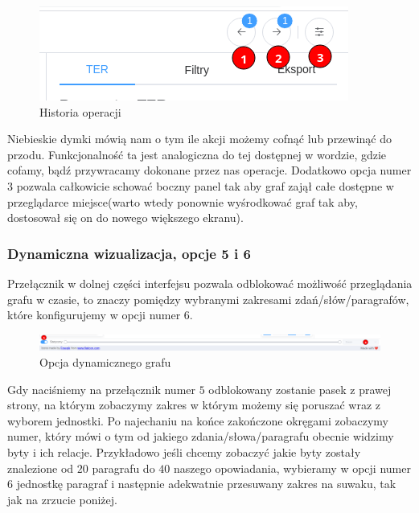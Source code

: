 \documentclass[12pt, a4paper]{article}
\begin{document}
\begin{figure}[H]
    \centering
    \includegraphics[width=\linewidth]{images/graph-top-navigation.png}
    \caption{Historia operacji}
\end{figure}

\noindent Niebieskie dymki mówią nam o tym ile akcji możemy cofnąć lub przewinąć do przodu. Funkcjonalność ta jest analogiczna do tej dostępnej w wordzie, gdzie cofamy, bądź przywracamy dokonane przez nas operacje. Dodatkowo opcja numer $3$ pozwala całkowicie schować boczny panel tak aby graf zajął całe dostępne w przeglądarce miejsce(warto wtedy ponownie wyśrodkować graf tak aby, dostosował się on do nowego większego ekranu).

\subsubsection{Dynamiczna wizualizacja, opcje 5 i 6}

Przełącznik w dolnej części interfejsu pozwala odblokować możliwość przeglądania grafu w czasie, to znaczy pomiędzy wybranymi zakresami zdań/słów/paragrafów, które konfigurujemy w opcji numer $6$.

\begin{figure}[H]
    \centering
    \includegraphics[width=\linewidth]{images/graph-down-menu.png}
    \caption{Opcja dynamicznego grafu}
\end{figure}

Gdy naciśniemy na przełącznik numer $5$ odblokowany zostanie pasek z prawej strony, na którym zobaczymy zakres w którym możemy się poruszać wraz z wyborem jednostki. Po najechaniu na końce zakończone okręgami zobaczymy numer, który mówi o tym od jakiego zdania/słowa/paragrafu obecnie widzimy byty i ich relacje. Przykładowo jeśli chcemy zobaczyć jakie byty zostały znalezione od $20$ paragrafu do $40$ naszego opowiadania, wybieramy w opcji numer $6$ jednostkę paragraf i następnie adekwatnie przesuwany zakres na suwaku, tak jak na zrzucie poniżej.
\end{document}

